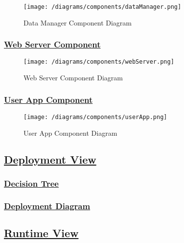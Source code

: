 			\begin{figure}[ht]
				\centering
				\texttt{[image: /diagrams/components/dataManager.png]}
				\caption{\label{fig:dataManagerComp} Data Manager Component Diagram}
			\end{figure}
		
		\subsubsection[Web Server Component]{\hyperlink{toc}{Web Server Component}}
			\label{sec:webServerComponent}
			
			\begin{figure}[ht]
				\centering
				\texttt{[image: /diagrams/components/webServer.png]}
				\caption{\label{fig:webServerComp} Web Server Component Diagram}
			\end{figure}
		
		\subsubsection[User App Component]{\hyperlink{toc}{User App Component}}
			\label{sec:userAppComponent}
			
			\begin{figure}[ht]
				\centering
				\texttt{[image: /diagrams/components/userApp.png]}
				\caption{\label{fig:userAppComp} User App Component Diagram}
			\end{figure}
		
	\subsection[Deployment View]{\hyperlink{toc}{Deployment View}}
		\label{sec:deploymentView}
		
		\subsubsection[Decision Tree]{\hyperlink{toc}{Decision Tree}}
			\label{sec:decisionTree}
			
		\subsubsection[Deployment Diagram]{\hyperlink{toc}{Deployment Diagram}}
			\label{sec:deploymentDiagram}
			
	\subsection[Runtime View]{\hyperlink{toc}{Runtime View}}
		\label{sec:runtimeView}
		
